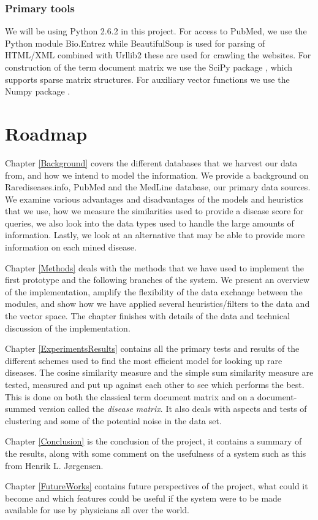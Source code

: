 
\subsubsection{Primary tools}
We will be using Python 2.6.2 \cite{PythonLanguage} in this project. For access to PubMed, we use
the Python module Bio.Entrez \cite{EntrezProgUtil} while BeautifulSoup
\cite{BS} is used for parsing of HTML/XML combined with Urllib2
\cite{UL2} these are used for crawling the websites. For construction
of the term document matrix we use the SciPy package \cite{SciPy},
which supports sparse matrix structures. For auxiliary vector
functions we use the Numpy package \cite{NumPy}.

\section{Roadmap}

Chapter \ref{Background} covers the different databases that we
harvest our data from, and how we intend to model the
information. We provide a background on Rarediseases.info, PubMed and
the MedLine database, our primary data sources. We examine various
advantages and disadvantages of the models and heuristics that we use,
how we measure the similarities used to provide a disease score for
queries, we also look into the data types used to handle the large
amounts of information. Lastly, we look at an alternative that may
be able to provide more information on each mined disease.

Chapter \ref{Methods} deals with the methods that we have used to
implement the first prototype and the following branches of the
system. We present an overview of the implementation, amplify the
flexibility of the data exchange between the modules, and show how we
have applied several heuristics/filters to the data and the vector
space. The chapter finishes with details of the data and technical
discussion of the implementation.

Chapter \ref{ExperimentsResults} contains all the primary tests and
results of the different schemes used to find the most efficient model
for looking up rare diseases. The cosine similarity measure and the
simple sum similarity measure are tested, measured and put up against
each other to see which performs the best. This is done on both the
classical term document matrix and on a document-summed version called
the \textit{disease matrix}. It also deals with aspects and tests of
clustering and some of the potential noise in the data set.

Chapter \ref{Conclusion} is the conclusion of the project, it contains
a summary of the results, along with some comment on the usefulness of
a system such as this from Henrik L. J\o rgensen.


Chapter \ref{FutureWorks} contains future perspectives of the project,
what could it become and which features could be useful if the system
were to be made available for use by physicians all over the world.

